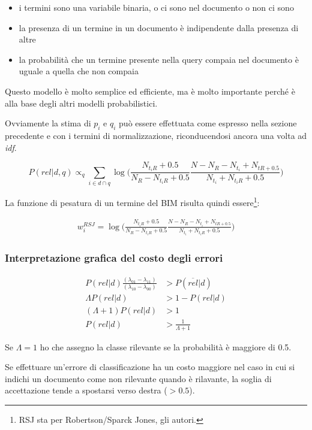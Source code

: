 \begin{itemize}
	\item i termini sono una variabile binaria, o ci sono nel documento o non ci sono
	\item la presenza di un termine in un documento è indipendente dalla presenza di altre
	\item la probabilità che un termine presente nella query compaia nel documento è uguale a quella che non compaia
\end{itemize}

\noindent Questo modello è molto semplice ed efficiente, ma è molto importante perché è alla base degli altri modelli probabilistici.

Ovviamente la stima di $p_i$ e $q_i$ può essere effettuata come espresso nella sezione precedente e con i termini di normalizzazione, riconducendosi ancora una volta ad \textit{idf}.

$$
\boxed{ P(rel|d,q) \propto_q \sum\limits_{i \in d \cap q} \log \bigg( \frac{N_{t_iR} + 0.5}{N_R - N_{t_iR} + 0.5} \frac{N - N_R - N_{t_i} + N_{tR + 0.5}}{N_{t_i} + N_{t_iR} +0.5} \bigg) }
$$

La funzione di pesatura di un termine del BIM risulta quindi essere\footnote{RSJ sta per Robertson/Sparck Jones, gli autori.}:

\begin{align}
\boxed{
w_i^{RSJ} = \log \bigg( \frac{N_{t_iR} + 0.5}{N_R - N_{t_iR} + 0.5} \frac{N - N_R - N_{t_i} + N_{tR + 0.5}}{N_{t_i} + N_{t_iR} +0.5} \bigg) \label{eq:wrsj}
}
\end{align}

\subsubsection{Interpretazione grafica del costo degli errori}

\begin{align*}
P(rel|d) \frac{(\lambda_{01} - \lambda_{11})}{(\lambda_{10} - \lambda_{00})} &> P(\overline{rel}|d) \\
\Lambda P(rel|d) &>1 -  P(rel|d) \\
(\Lambda +1 ) P(rel|d) &> 1 \\
P(rel |d ) &> \frac{1}{\Lambda +1}
\end{align*}

\noindent Se $\Lambda = 1$ ho che assegno la classe rilevante se la probabilità è maggiore di 0.5.

Se effettuare un'errore di classificazione ha un costo maggiore nel caso in cui si indichi un documento come non rilevante quando è rilavante, la soglia di accettazione tende a spostarsi verso destra ($> 0.5$).\\

